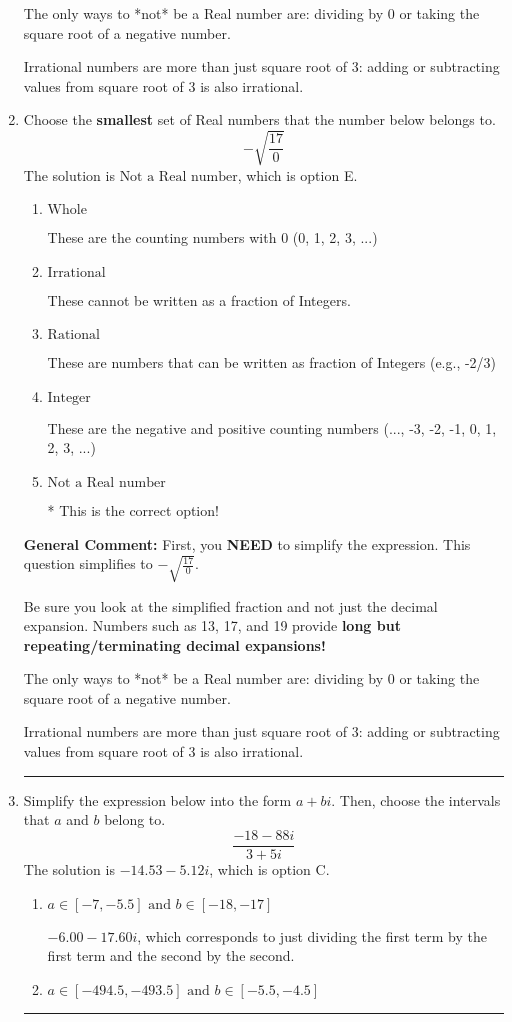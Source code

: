 \documentclass{extbook}[14pt]
\newcommand{\litem}[1]{\item #1

\rule{\textwidth}{0.4pt}}
\begin{document}
\begin{enumerate}
{ The only ways to *not* be a Real number are: dividing by 0 or taking the square root of a negative number. 
 
 Irrational numbers are more than just square root of 3: adding or subtracting values from square root of 3 is also irrational.
}
\litem{
Choose the \textbf{smallest} set of Real numbers that the number below belongs to.
\[ -\sqrt{\frac{17}{0}} \]The solution is \( \text{Not a Real number} \), which is option E.\begin{enumerate}[label=\Alph*.]
\item \( \text{Whole} \)

These are the counting numbers with 0 (0, 1, 2, 3, ...)
\item \( \text{Irrational} \)

These cannot be written as a fraction of Integers.
\item \( \text{Rational} \)

These are numbers that can be written as fraction of Integers (e.g., -2/3)
\item \( \text{Integer} \)

These are the negative and positive counting numbers (..., -3, -2, -1, 0, 1, 2, 3, ...)
\item \( \text{Not a Real number} \)

* This is the correct option!
\end{enumerate}

\textbf{General Comment:} First, you \textbf{NEED} to simplify the expression. This question simplifies to $-\sqrt{\frac{17}{0}}$. 
 
 Be sure you look at the simplified fraction and not just the decimal expansion. Numbers such as 13, 17, and 19 provide \textbf{long but repeating/terminating decimal expansions!} 
 
 The only ways to *not* be a Real number are: dividing by 0 or taking the square root of a negative number. 
 
 Irrational numbers are more than just square root of 3: adding or subtracting values from square root of 3 is also irrational.
}
\litem{
Simplify the expression below into the form $a+bi$. Then, choose the intervals that $a$ and $b$ belong to.
\[ \frac{-18 - 88 i}{3 + 5 i} \]The solution is \( -14.53  - 5.12 i \), which is option C.\begin{enumerate}[label=\Alph*.]
\item \( a \in [-7, -5.5] \text{ and } b \in [-18, -17] \)

 $-6.00  - 17.60 i$, which corresponds to just dividing the first term by the first term and the second by the second.
\item \( a \in [-494.5, -493.5] \text{ and } b \in [-5.5, -4.5] \)


\end{enumerate}}
\end{enumerate}
\end{document}
